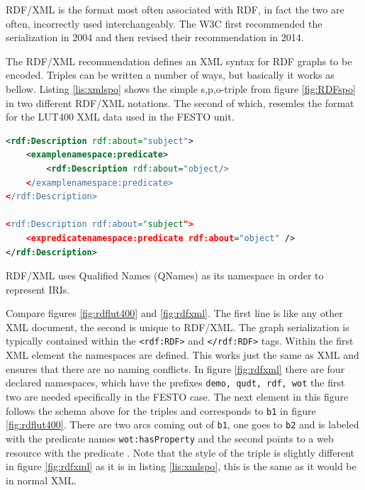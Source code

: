 RDF/XML is the format most often associated with RDF, in fact the two are often, incorrectly used interchangeably\cite{Hogan.2014}. The W3C first recommended the serialization in 2004 and then revised their recommendation in 2014\cite{RDFXML.02.10.2017}.

The RDF/XML recommendation defines an XML syntax for RDF graphs to be encoded. Triples can be written a number of ways\cite{RDFXML.02.10.2017}, but basically it works as bellow. Listing \ref{lis:xmlspo} shows the simple s,p,o-triple from figure \ref{fig:RDFspo} in two different RDF/XML notations. The second of which, resemles the format for the LUT400 XML data used in the FESTO unit.

\begin{lstlisting}[language=XML, caption={A trivial RDF triple in RDF/XML}, label={lis:xmlspo}]
<rdf:Description rdf:about="subject">
    <examplenamespace:predicate>
        <rdf:Description rdf:about="object/>
    </examplenamespace:predicate>
</rdf:Description>

<rdf:Description rdf:about="subject">
    <expredicatenamespace:predicate rdf:about="object" />
</rdf:Description>
\end{lstlisting}
\vspace{1cm}

RDF/XML uses Qualified Names (QNames) as its namespace in order to represent IRIs. 

Compare figures \ref{fig:rdflut400} and \ref{fig:rdfxml}. The first line is like any other XML document, the second is unique to RDF/XML. The graph serialization is typically contained within the \texttt{<rdf:RDF>} and \texttt{</rdf:RDF>} tags. Within the first XML element the namespaces are defined. This works just the same as XML and ensures that there are no naming conflicts. In figure \ref{fig:rdfxml} there are four declared namespaces, which have the prefixes \texttt{demo, qudt, rdf, wot} the first two are needed specifically in the FESTO case. The next element in this figure follows the schema above for the triples and corresponds to \texttt{b1} in figure \ref{fig:rdflut400}. There are two arcs coming out of \texttt{b1}, one goes to \texttt{b2} and is labeled with the predicate names \texttt{wot:hasProperty} and the second points to a web resource with the predicate . Note that the style of the triple is slightly different in figure \ref{fig:rdfxml} as it is in listing \ref{lis:xmlspo}, this is the same as it would be in normal XML.      \cite{RDFXML.02.10.2017}




